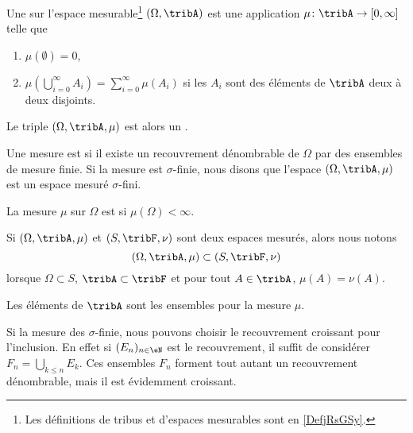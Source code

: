 \begin{definition}  \label{DefBTsgznn}
    Une  sur l'espace mesurable\footnote{Les définitions de tribus et d'espaces mesurables sont en \ref{DefjRsGSy}.} \( (\Omega,\tribA)\) est une application \( \mu\colon \tribA\to \mathopen[ 0 , \infty \mathclose]\) telle que
    \begin{enumerate}
        \item
            \( \mu(\emptyset)=0\),
        \item   \label{ItemQFjtOjXiii}
            \( \mu\left( \bigcup_{i=0}^{\infty}A_i\right)=\sum_{i=0}^{\infty}\mu(A_i)\) si les \( A_i\) sont des éléments de \( \tribA\) deux à deux disjoints.
    \end{enumerate}
            Le triple \( (\Omega,\tribA,\mu)\) est alors un .

    Une mesure est  si il existe un recouvrement dénombrable de \( \Omega\) par des ensembles de mesure finie. Si la mesure est $\sigma$-finie, nous disons que l'espace \( (\Omega,\tribA,\mu)\) est un espace mesuré $\sigma$-fini.

    La mesure \( \mu\) sur \( \Omega\) est  si \( \mu(\Omega)<\infty\).
\end{definition}

Si \( (\Omega,\tribA,\mu)\) et \( (S,\tribF,\nu)\) sont deux espaces mesurés, alors nous notons
\begin{equation}
    (\Omega,\tribA,\mu)\subset (S,\tribF,\nu)
\end{equation}
lorsque \( \Omega\subset S\), \( \tribA\subset\tribF\) et pour tout \( A\in\tribA\), \( \mu(A)=\nu(A)\).

\begin{definition}\label{DefHGsQxHB}
    Les éléments de \( \tribA\) sont les ensembles  pour la mesure \( \mu\).
\end{definition}

Si la mesure des \( \sigma\)-finie, nous pouvons choisir le recouvrement croissant pour l'inclusion. En effet si \( (E_n)_{n\in \eN}\) est le recouvrement, il suffit de considérer \( F_n=\bigcup_{k\leq n}E_k\). Ces ensembles \( F_n\) forment tout autant un recouvrement dénombrable, mais il est évidemment croissant.

